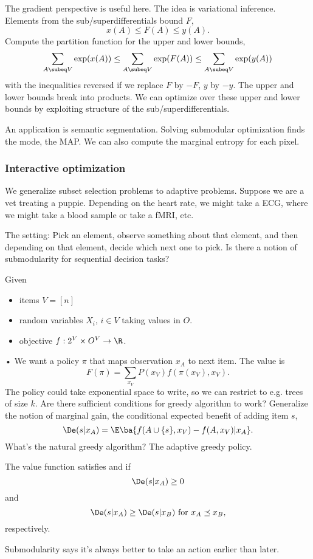 The gradient perspective is useful here. The idea is variational inference. 
Elements from the sub/superdifferentials bound $F$,
$$
x(A)\le F(A) \le y(A).
$$
Compute the partition function for the upper and lower bounds,
$$
\sum_{A\subeq V} \exp(x(A))\le \sum_{A\subeq V} \exp(F(A)) \le \sum_{A\subeq V}\exp(y(A))
$$
with the inequalities reversed if we replace $F$ by $-F$, $y$ by $-y$.
The upper and lower bounds break into products. We can optimize over these upper and lower bounds by exploiting structure of the sub/superdifferentials.

An application is semantic segmentation. Solving submodular optimization finds the mode, the MAP. We can also compute the marginal entropy for each pixel.

\subsubsection{Interactive optimization}

We generalize subset selection problems to adaptive problems. Suppose we are a vet treating a puppie. Depending on the heart rate, we might take a ECG, where we might take a blood sample or take a fMRI, etc.

The setting: Pick an element, observe something about that element, and then depending on that element, decide which next one to pick. Is there a notion of submodularity for sequential decision tasks?

Given
\begin{itemize}
\item
items $V=[n]$
\item
random variables $X_i$, $i\in V$ taking values in $O$.
\item
objective $f:2^V\times O^V\to \R$.
\end{itemize}•
We want a policy $\pi$ that maps observation $x_A$ to next item. The value is
$$
F(\pi) = \sum_{x_V} P(x_V) f(\pi(x_V), x_V).
$$
The policy could take exponential space to write, so we can restrict to e.g.  trees of size $k$. Are there sufficient conditions for greedy algorithm to work?
Generalize the notion of marginal gain, the conditional expected benefit of adding item $s$,
$$
\De(s|x_A) = \E\ba{
f(A\cup \{s\}, x_V) - f(A,x_V)|x_A
}.
$$
What's the natural greedy algorithm? %
The adaptive greedy policy. %

\begin{df}
The value function satisfies 
 and  if
$$
\De(s|x_A)\ge 0$$ and $$\De(s|x_A) \ge \De(s|x_B)\text{ for }x_A\preceq x_B,$$
respectively.
\end{df}
Submodularity says it's always better to take an action earlier than later.

